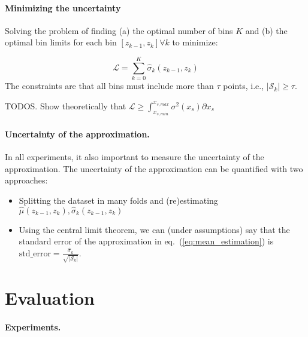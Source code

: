 \documentclass{article}
\begin{document}
\paragraph{Minimizing the uncertainty}

Solving the problem of finding (a) the optimal number of bins \(K\) and (b) the optimal bin limits for each bin \([z_{k-1}, z_k] \forall k\) to minimize:

\begin{equation}
  \label{eq:1}
  \mathcal{L} = \sum_{k=0}^K \hat{\sigma}_k(z_{k-1}, z_k)
\end{equation}
%
The constraints are that all bins must include more than \(\tau\)
points, i.e., \(|\mathcal{S}_k| \geq \tau\).

\noindent
TODOS. Show theoretically that \(\mathcal{L} \geq \int_{x_{s, min}}^{x_{s, max}}\sigma^2(x_s) \partial x_s\)

\paragraph{Uncertainty of the approximation.}

In all experiments, it also important to measure the uncertainty of
the approximation. The uncertainty of the approximation can be
quantified with two approaches:

\begin{itemize}
\item Splitting the dataset in many folds and (re)estimating
  \(\hat{\mu}(z_{k-1}, z_k), \hat{\sigma}_k(z_{k-1}, z_k)\)
\item Using the central limit theorem, we can (under assumptions) say
  that the standard error of the approximation in
  eq.~(\ref{eq:mean_estimation}) is
  \(\mathrm{std\_error} =
  \frac{\hat{\sigma}_k}{\sqrt{|\mathcal{S}_k|}}\).
\end{itemize}

\section{Evaluation}

\paragraph{Experiments.}

\end{document}

